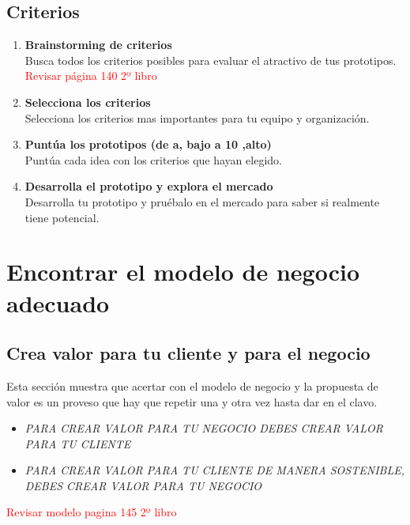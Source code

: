\documentclass[11pt]{book}
\begin{document}
\subsection{Criterios}
\begin{enumerate}
\item \textbf{ Brainstorming de criterios }\\
Busca todos los criterios posibles para evaluar el atractivo de tus prototipos.\\
\textcolor{red}{Revisar página 140 2º libro}

\item \textbf{ Selecciona los criterios }\\
Selecciona los criterios mas importantes para tu equipo y organización.
\item \textbf{ Puntúa los prototipos (de a, bajo a 10 ,alto) }\\
Puntúa cada idea con los criterios que hayan elegido.
\item \textbf{ Desarrolla el prototipo y explora el mercado }\\
Desarrolla tu prototipo y pruébalo en el mercado para saber si realmente tiene potencial.
\end{enumerate}
\section{ Encontrar el modelo de negocio adecuado}
\subsection{Crea valor para tu cliente y para el negocio}
Esta sección muestra que acertar con el modelo de negocio y la propuesta de valor es un proveso que hay que repetir una y otra vez hasta dar en el clavo.\\
\begin{itemize}
\item \textit{PARA CREAR VALOR PARA TU NEGOCIO DEBES CREAR VALOR PARA TU CLIENTE}
\item \textit{PARA CREAR VALOR PARA TU CLIENTE DE MANERA SOSTENIBLE, DEBES CREAR VALOR PARA TU NEGOCIO}
\end{itemize}
\textcolor{red}{Revisar modelo pagina 145 2º libro}
\end{document}
